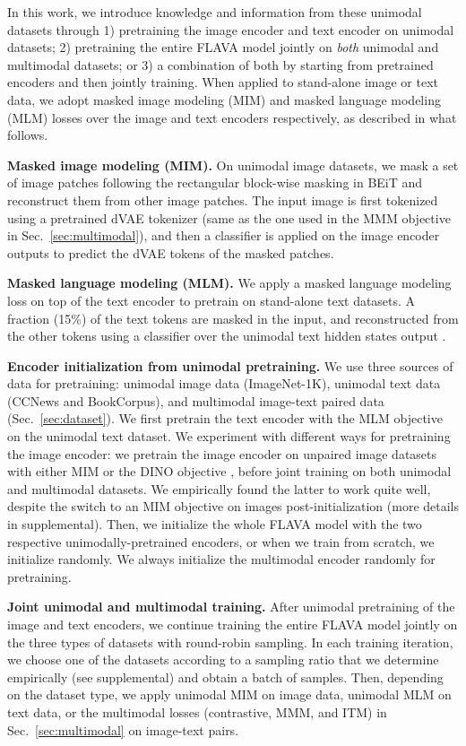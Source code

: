 \documentclass[10pt,twocolumn,letterpaper]{article}
\newcommand{\myparagraph}[1]{\vspace{0.25em}\noindent\textbf{#1}}
\begin{document}
In this work, we introduce knowledge and information from these unimodal datasets through 1) pretraining the image encoder and text encoder on unimodal datasets; 2) pretraining the entire FLAVA model jointly on \textit{both} unimodal and multimodal datasets; or 3) a combination of both by starting from pretrained encoders and then jointly training. When applied to stand-alone image or text data, we adopt masked image modeling (MIM) and masked language modeling (MLM) losses over the image and text encoders respectively, as described in what follows.

\myparagraph{Masked image modeling (MIM).} On unimodal image datasets, we mask a set of image patches following the rectangular block-wise masking in BEiT \cite{bao2021beit} and reconstruct them from other image patches. The input image is first tokenized using a pretrained dVAE tokenizer \cite{dalle} (same as the one used in the MMM objective in Sec.~\ref{sec:multimodal}), and then a classifier is applied on the image encoder outputs  to predict the dVAE tokens of the masked patches.

\myparagraph{Masked language modeling (MLM).} We apply a masked language modeling loss \cite{devlin2018bert} on top of the text encoder to pretrain on stand-alone text datasets. A fraction (15\%) of the text tokens are masked in the input, and reconstructed from the other tokens using a classifier over the unimodal text hidden states output .

\myparagraph{Encoder initialization from unimodal pretraining.} We use three sources of data for pretraining: unimodal image data (ImageNet-1K\cite{imagenet}), unimodal text data (CCNews\cite{liu2019roberta} and BookCorpus\cite{zhu2015aligning}), and multimodal image-text paired data (Sec.~\ref{sec:dataset}). We first pretrain the text encoder with the MLM objective on the unimodal text dataset. We experiment with different ways for pretraining the image encoder: we pretrain the image encoder on unpaired image datasets with either MIM or the DINO objective \cite{caron2021emerging}, before joint training on both unimodal and multimodal datasets. We empirically found the latter to work quite well, despite the switch to an MIM objective on images post-initialization (more details in supplemental).
Then, we initialize the whole FLAVA model with the two respective unimodally-pretrained encoders, or when we train from scratch, we initialize randomly. We always initialize the multimodal encoder randomly for pretraining.

\myparagraph{Joint unimodal and multimodal training.} After unimodal pretraining of the image and text encoders, we continue training the entire FLAVA model jointly on the three types of datasets with round-robin sampling. In each training iteration, we choose one of the datasets according to a sampling ratio that we determine empirically (see supplemental) and obtain a batch of samples. Then, depending on the dataset type, we apply unimodal MIM on image data, unimodal MLM on text data, or the multimodal losses (contrastive, MMM, and ITM) in Sec.~\ref{sec:multimodal} on image-text pairs.
\end{document}
